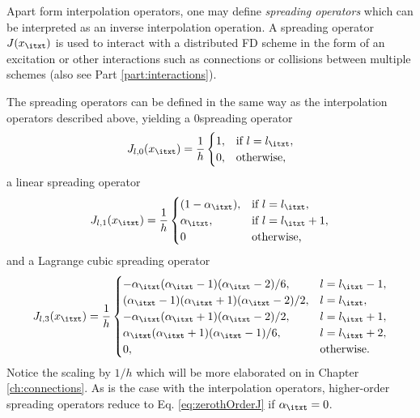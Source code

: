 Apart form interpolation operators, one may define \textit{spreading operators} which can be interpreted as an inverse interpolation operation. A spreading operator $J(x_\itxt)$ is used to interact with a distributed FD scheme in the form of an excitation or other interactions such as connections or collisions between multiple schemes (also see Part \ref{part:interactions}).

The spreading operators can be defined in the same way as the interpolation operators described above, yielding a $0$\thOrder spreading operator
\begin{equation}\label{eq:zerothOrderJ}
    J_{l,0}(x_\itxt) = \frac{1}{h}\begin{cases}
        1, & \text{if}\ l = l_\itxt,\\
        0, & \text{otherwise},
    \end{cases}
\end{equation}
a linear spreading operator
\begin{equation}\label{eq:firstOrderJ}
    J_{l,1}(x_\itxt) = \frac{1}{h}\begin{cases}
        (1-\alpha_\itxt), & \text{if}\ l = l_\itxt,\\
        \alpha_\itxt , & \text{if}\ l = l_\itxt + 1,\\
        0 & \text{otherwise,}
    \end{cases}
\end{equation}
and a Lagrange cubic spreading operator
\begin{equation}\label{eq:cubicJ}
    J_{l,3}(x_\itxt) = \frac{1}{h}\begin{cases}
        -\alpha_\itxt (\alpha_\itxt-1)(\alpha_\itxt-2)/6, & l = l_\itxt-1,\\
        (\alpha_\itxt-1)(\alpha_\itxt+1)(\alpha_\itxt-2)/2,  & l = l_\itxt,\\
        -\alpha_\itxt (\alpha_\itxt+1)(\alpha_\itxt-2)/2, & l = l_\itxt + 1,\\
        \alpha_\itxt (\alpha_\itxt+1)(\alpha_\itxt-1)/6, & l = l_\itxt + 2,\\
        0, & \text{otherwise.}
    \end{cases}
\end{equation}
Notice the scaling by $1/h$ which will be more elaborated on in Chapter \ref{ch:connections}. As is the case with the interpolation operators, higher-order spreading operators reduce to Eq. \eqref{eq:zerothOrderJ} if $\alpha_\itxt = 0$.

